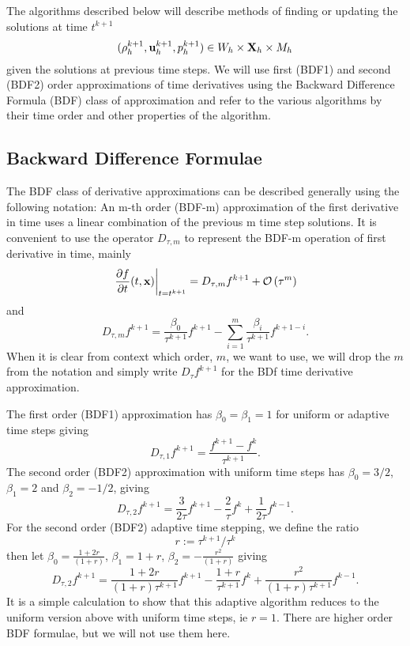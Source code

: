 \documentclass[letterpaper]{erdc}
\begin{document}
The algorithms described below will describe methods of finding or updating the solutions at time $t^{k+1}$
\begin{equation}(\rho^{k+1}_h, \textbf{u}^{k+1}_{h}, p^{k+1}_h) \in W_h\times\textbf{X}_h\times M_h  \end{equation}
given the solutions at previous time steps.  We will use first (BDF1) and second (BDF2) order approximations of time derivatives using the Backward Difference Formula (BDF) class of approximation and refer to the various algorithms by their time order and other properties of the algorithm.

\subsection{Backward Difference Formulae}
The BDF class of derivative approximations can be described generally using the following notation: An m-th order (BDF-m) approximation of the first derivative in time  uses a linear combination of the previous m time step solutions. It is convenient to use the operator $D_{\tau,m}$ to represent the BDF-m operation of first derivative in time, mainly
\begin{equation}
 \left.\frac{\partial f}{\partial t}(t,\textbf{x})\right|_{t=t^{k+1}} =  D_{\tau,m}f^{k+1} + \mathcal{O}\left(\tau^m\right)
\end{equation}
and
\begin{equation}
  D_{\tau,m}f^{k+1} =  \frac{\beta_0}{\tau^{k+1}}f^{k+1} - \displaystyle\sum_{i=1}^{m} \frac{\beta_{i}}{\tau^{k+1}} f^{k+1-i}.
\end{equation}
When it is clear from context which order, $m$, we want to use, we will drop the $m$ from the notation and simply write $D_{\tau}f^{k+1}$ for the BDf time derivative approximation.


The first order (BDF1) approximation has $\beta_0 = \beta_1 = 1$ for uniform or adaptive time steps giving
\begin{equation}
  D_{\tau,1} f^{k+1} = \frac{f^{k+1} - f^{k}}{\tau^{k+1}}.
\end{equation}
The second order (BDF2) approximation with uniform time steps has $\beta_0 = 3/2$, $\beta_1 = 2$ and $\beta_2 = -1/2$, giving
\begin{equation}  
  D_{\tau,2} f^{k+1} = \frac{3}{2\tau}f^{k+1} - \frac{2}{\tau}f^{k} + \frac{1}{2\tau}f^{k-1}.
\end{equation}
For the second order (BDF2) adaptive time stepping, we define the ratio
\begin{equation}
  r:=\tau^{k+1}/\tau^{k}
\end{equation}
then let $\beta_0 = \frac{1+2r}{(1+r)}$, $\beta_1 = 1+r$, $\beta_2 = -\frac{r^2}{(1+r)}$ giving
\begin{equation}  
  D_{\tau,2} f^{k+1} = \frac{1+2r}{(1+r)\tau^{k+1}}f^{k+1} - \frac{1+r}{\tau^{k+1}}f^{k} + \frac{r^2}{(1+r)\tau^{k+1}}f^{k-1}.
\end{equation}
It is a simple calculation to show that this adaptive algorithm reduces to the uniform version above with uniform time steps, ie $r=1$.  There are higher order BDF formulae, but we will not use them here.
\end{document}

